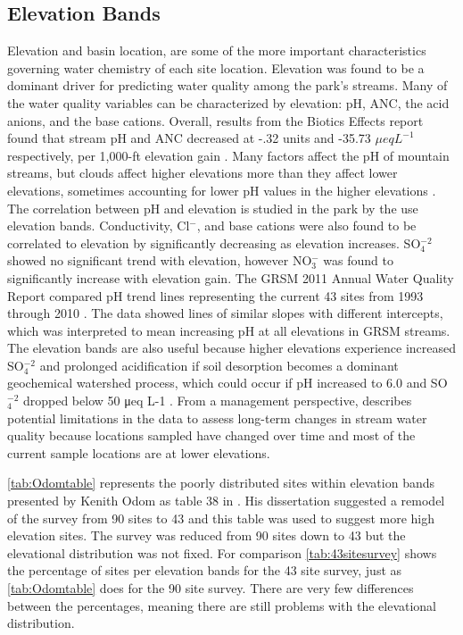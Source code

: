 \subsection{Elevation Bands}

Elevation and basin location, are some of the more important characteristics governing water chemistry of each site location\citep{neff2012influence}.
Elevation was found to be a dominant driver for predicting water quality among the park's streams. 
Many of the water quality variables can be characterized by elevation: pH, ANC, the acid anions, and the base cations.
Overall, results from the Biotics Effects report found that stream pH and ANC decreased at -.32 units and -35.73 $\mu eq L^{-1}$ respectively, per 1,000-ft elevation gain \citep{cai2013}. 
Many factors affect the pH of mountain streams, but clouds affect higher elevations more than they affect lower elevations, sometimes accounting for lower pH values in the higher elevations \citep{shubzda1995}.
The correlation between pH and elevation is studied in the park by the use elevation bands.
Conductivity, Cl$^-$, and base cations were also found to be correlated to elevation by significantly decreasing as elevation increases.  
SO$_4^{-2}$ showed no significant trend with elevation, however NO$_3^-$ was found to significantly increase with elevation gain.  
The GRSM 2011 Annual Water Quality Report compared pH trend lines representing the current 43 sites from 1993 through 2010 \citep{annualreport2012}.  
The data showed lines of similar slopes with different intercepts, which was interpreted to mean increasing pH at all elevations in GRSM streams.  
The elevation bands are also useful because higher elevations experience increased SO$_4^{-2}$ and prolonged acidification if soil desorption becomes a dominant geochemical watershed process, which could occur if pH increased to 6.0 and SO$_4^{-2}$ dropped below 50 μeq L-1 \citep{annualreport2012}.  
From a management perspective, \citet{cai2013} describes potential limitations in the data to assess long-term changes in stream water quality because locations sampled have changed over time and most of the current sample locations are at lower elevations.





\autoref{tab:Odomtable} represents the poorly distributed sites within elevation bands presented by Kenith Odom as table 38 in \citet{odom2003}.
His dissertation suggested a remodel of the survey from 90 sites to 43 and this table was used to suggest more high elevation sites.
The survey was reduced from 90 sites down to 43 but the elevational distribution was not fixed.
For comparison \autoref{tab:43sitesurvey} shows the percentage of sites per elevation bands for the 43 site survey, just as \autoref{tab:Odomtable} does for the 90 site survey.
There are very few differences between the percentages, meaning there are still problems with the elevational distribution.

